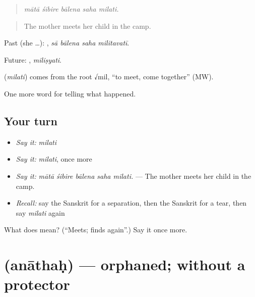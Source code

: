 \begin{quote}
    
\end{quote}

\begin{quote}
\emph{mātā śibire bālena saha milati.}
\end{quote}

\begin{quote}
The mother meets her child in the camp.
\end{quote}

Past (she …):    , \emph{sā bālena saha militavatī}.

Future: , \emph{miliṣyati}.

\begin{cousinweb}
\textbf{} (\emph{milati}) comes from the root √mil, \textquotedblleft{}to meet, come together\textquotedblright{} (MW).
\end{cousinweb}

\begin{grammarlens}[title={What you've built}]
One more word for telling what happened.
\end{grammarlens}

\subsection*{Your turn}
\begin{itemize}
\raggedright
  \item \emph{Say it:} \emph{milati}
  \item \emph{Say it:} \emph{milati}, once more
  \item \emph{Say it:} \emph{mātā śibire bālena saha milati.} — The mother meets her child in the camp.
  \item \emph{Recall:} say the Sanskrit for a separation, then the Sanskrit for a tear, then say \emph{milati} again
\end{itemize}

\begin{tcolorbox}[breakable,colback=teal!4,colframe=teal!35!black,title={Before you move on}]
What does  mean? (\textquotedblleft{}Meets; finds again\textquotedblright{}.) Say it once more.
\end{tcolorbox}
\section[\texorpdfstring{\sk{अनाथः} (anāthaḥ)}{अनाथः (anāthaḥ)}]{ (anāthaḥ) — orphaned; without a protector}

